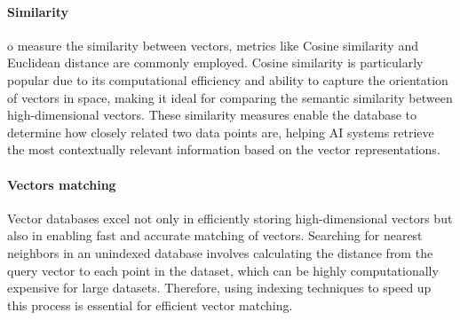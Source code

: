 \paragraph*{Similarity}
o measure the similarity between vectors, metrics like Cosine similarity and Euclidean distance are commonly employed.
Cosine similarity is particularly popular due to its computational efficiency and ability to capture the orientation of vectors in space, making it ideal for comparing the semantic similarity between high-dimensional vectors. 
These similarity measures enable the database to determine how closely related two data points are, helping AI systems retrieve the most contextually relevant information based on the vector representations.

\paragraph*{Vectors matching}
Vector databases excel not only in efficiently storing high-dimensional vectors but also in enabling fast and accurate matching of vectors. 
Searching for nearest neighbors in an unindexed database involves calculating the distance from the query vector to each point in the dataset, which can be highly computationally expensive for large datasets.
Therefore, using indexing techniques to speed up this process is essential for efficient vector matching.

